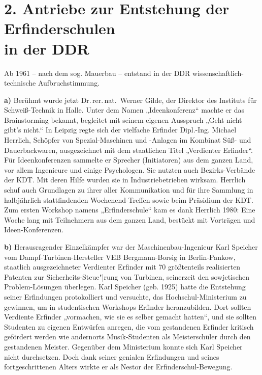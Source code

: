 \documentclass[11pt,a4paper]{article}
\begin{document}
\section*{2. Antriebe zur Entstehung der Erfinderschulen\\ in der DDR}

Ab 1961 -- nach dem sog. Mauerbau -- entstand in der DDR
wissenschaftlich-technische Aufbruchstimmung.

\textbf{a)} 
Berühmt wurde jetzt Dr.\,rer.\,nat.~Werner Gilde, der Direktor des Instituts
für Schweiß-Technik in Halle. Unter dem Namen „Ideenkonferenz“ machte er das
Brainstorming bekannt, begleitet mit seinem eigenen Ausspruch „Geht nicht
gibt's nicht.“ In Leipzig regte sich der vielfache Erfinder Dipl.-Ing. Michael
Herrlich, Schöpfer von Spezial-Maschinen und -Anlagen im Kombinat Süß- und
Dauerbackwaren, ausgezeichnet mit dem staatlichen Titel „Verdienter Erfinder“.
Für Ideenkonferenzen sammelte er Sprecher (Initiatoren) aus dem ganzen Land,
vor allem Ingenieure und einige Psychologen. Sie nutzten auch Bezirks-Verbände
der KDT. Mit deren Hilfe wurden sie in Industriebetrieben wirksam. Herrlich
schuf auch Grundlagen zu ihrer aller Kommunikation und für ihre Sammlung in
halbjährlich stattfindenden Wochenend-Treffen sowie beim Präsidium der KDT. Zum
ersten Workshop namens „Erfinderschule“ kam es dank Herrlich 1980: Eine Woche
lang mit Teilnehmern aus dem ganzen Land, bestückt mit Vorträgen und
Ideen-Konferenzen.

\textbf{b)} 
Herausragender Einzelkämpfer war der Maschinenbau-Ingenieur Karl Speicher vom
Dampf-Turbinen-Hersteller VEB Bergmann-Borsig in Berlin-Pankow, staatlich
ausgezeichneter Verdienter Erfinder mit 70 größtenteils realisierten Patenten
zur Sicherheits-Steue"|rung von Turbinen, seinerzeit den sowjetischen
Problem-Lösungen überlegen. Karl Speicher (geb. 1925) hatte die Entstehung
seiner Erfindungen protokolliert und versuchte, das Hochschul-Ministerium zu
gewinnen, um in studentischen Workshops Erfinder heranzubilden. Dort sollten
Verdiente Erfinder „vormachen, wie sie es selber gemacht hatten“, und sie
sollten Studenten zu eigenen Entwürfen anregen, die vom gestandenen Erfinder
kritisch gefördert werden wie andernorts Musik-Studenten als Meisterschüler
durch den gestandenen Meister. Gegenüber dem Ministerium konnte sich Karl
Speicher nicht durchsetzen. Doch dank seiner genialen Erfindungen und seines
fortgeschrittenen Alters wirkte er als Nestor der Erfinderschul-Bewegung.
\end{document}
